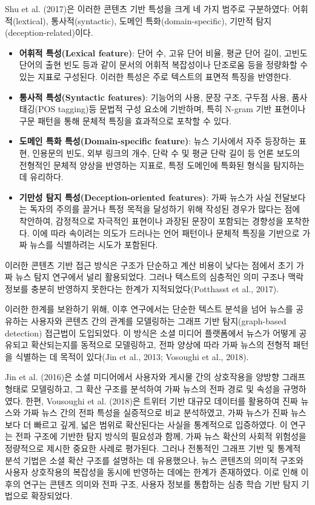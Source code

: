 \documentclass[a4paper,fleqn]{cas-sc}
\begin{document}
Shu et al. (2017)은 이러한 콘텐츠 기반 특성을 크게 네 가지 범주로 구분하였다: 어휘적(lextical), 통사적(syntactic), 도메인 특화(domain-specific), 기만적 탐지(deception-related)이다.

\begin{itemize}
    \item{\textbf{어휘적 특성(Lexical feature)}:
    단어 수, 고유 단어 비율, 평균 단어 길이, 고빈도 단어의 출현 빈도 등과 같이 문서의 어휘적 복잡성이나 단조로움 등을 정량화할 수 있는 지표로 구성된다. 이러한 특성은 주로 텍스트의 표면적 특징을 반영한다.}

    \item{\textbf{통사적 특성(Syntactic features)}:
    기능어의 사용, 문장 구조, 구두점 사용, 품사 태깅(POS tagging)등 문법적 구성 요소에 기반하며, 특히 N-gram 기반 표현이나 구문 패턴을 통해 문체적 특징을 효과적으로 포착할 수 있다.}
    
    \item{\textbf{도메인 특화 특성(Domain-specific feature)}:
    뉴스 기사에서 자주 등장하는 표현, 인용문의 빈도, 외부 링크의 개수, 단락 수 및 평균 단락 길이 등 언론 보도의 전형적인 문체적 양상을 반영하는 지표로, 특정 도메인에 특화된 형식을 탐지하는 데 유리하다.}
    \item{\textbf{기만성 탐지 특성(Deception-oriented features)}:
    가짜 뉴스가 사실 전달보다는 독자의 주의를 끌거나 특정 목적을 달성하기 위해 작성된 경우가 많다는 점에 착안하여, 감정적으로 자극적인 표현이나 과장된 문장이 포함되는 경향성을 포착한다. 이에 따라 속이려는 의도가 드러나는 언어 패턴이나 문체적 특징을 기반으로 가짜 뉴스를 식별하려는 시도가 포함된다.}
\end{itemize}
  

이러한 콘텐츠 기반 접근 방식은 구조가 단순하고 계산 비용이 낮다는 점에서 초기 가짜 뉴스 탐지 연구에서 널리 활용되었다. 그러나 텍스트의 심층적인 의미 구조나 맥락 정보를 충분히 반영하지 못한다는 한계가 지적되었다(Potthasst et al., 2017).

이러한 한계를 보완하기 위해, 이후 연구에서는 단순한 텍스트 분석을 넘어 뉴스를 공유하는 사용자와 콘텐츠 간의 관계를 모델링하는 그래프 기반 탐지(graph-based detection) 접근법이 도입되었다. 이 방식은 소셜 미디어 플랫폼에서 뉴스가 어떻게 공유되고 확산되는지를 동적으로 모델링하고, 전파 양상에 따라 가짜 뉴스의 전형적 패턴을 식별하는 데 목적이 있다(Jin et al., 2013; Vosoughi et al., 2018). 

Jin et al. (2016)은 소셜 미디어에서 사용자와 게시물 간의 상호작용을 양방향 그래프 형태로 모델링하고, 그 확산 구조를 분석하여 가짜 뉴스의 전파 경로 및 속성을 규명하였다. 한편, Vousoughi et al. (2018)은 트위터 기반 대규모 데이터를 활용하여 진짜 뉴스와 가짜 뉴스 간의 전파 특성을 실증적으로 비교 분석하였고, 가짜 뉴스가 진짜 뉴스보다 더 빠르고 깊게, 넓은 범위로 확산된다는 사실을 통계적으로 입증하였다. 이 연구는 전파 구조에 기반한 탐지 방식의 필요성과 함께, 가짜 뉴스 확산의 사회적 위험성을 정량적으로 제시한 중요한 사례로 평가된다.
그러나 전통적인 그래프 기반 및 통계적 분석 기법은 소셜 확산 구조를 설명하는 데 유용했으나, 뉴스 콘텐츠의 의미적 구조와 사용자 상호작용의 복잡성을 동시에 반영하는 데에는 한계가 존재하였다. 이로 인해 이후의 연구는 콘텐츠 의미와 전파 구조, 사용자 정보를 통합하는 심층 학습 기반 탐지 기법으로 확장되었다. 
\end{document}
